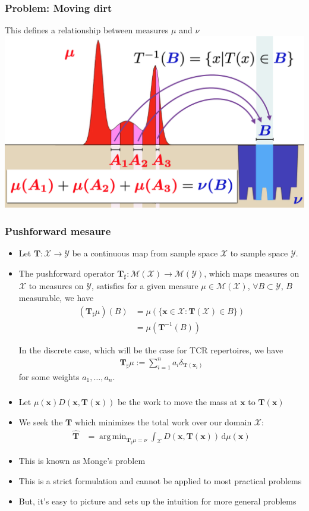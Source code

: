 \documentclass[mathserif,compress,xcolor={dvipsnames}]{beamer}
\newcommand*\ba{\[ \begin{aligned}}
\newcommand*\ea{\end{aligned} \]}
\newcommand*\estim[1]{\widehat{#1}}
\newcommand*\der{\text{d}}
\DeclareMathOperator*{\argmin}{arg\;min}
\renewcommand\;{\,}
\newcommand{\bx}{\mathbf x}
\newcommand{\bT}{\mathbf T}
\begin{document}
\begin{frame}\frametitle{Problem: Moving dirt}
This defines a relationship between measures $\mu$ and $\nu$
\bigskip
\includegraphics[width=\linewidth]{Figures/EMD_pushforward.png}
\end{frame}

\begin{frame}\frametitle{Pushforward mesaure}
\begin{itemize}
\item
Let $\mathbf T : \mathcal X \to \mathcal Y$ be a continuous map from sample space $\mathcal X$ to sample space $\mathcal Y$.
\item
The pushforward operator $\mathbf T_\sharp : \mathcal M(\mathcal X) \to \mathcal M(\mathcal Y)$, which maps measures on $\mathcal X$ to measures on $\mathcal Y$, satisfies for a given measure $\mu \in \mathcal M(\mathcal X)$,
 $\forall B \subset \mathcal Y$, $B$ measurable, we have
\begin{align}
    \left(\mathbf T_\sharp \mu\right) (B) 
    & = \mu\left( \{ \mathbf x \in \mathcal X : \mathbf T(\mathcal X) \in B \} \right) \\
    & = \mu\left(\mathbf T^{-1}(B) \right)
\end{align}

In the discrete case, which will be the case for TCR repertoires, we have
\ba
    \mathbf T_\sharp \mu := \sum_{i=1}^n a_i \delta_{\mathbf T(\mathbf x_i)}
\ea
for some weights $a_1, \dotsc, a_n$. 
\end{itemize}
\end{frame}

\begin{frame}\frametitle{}
\begin{itemize}
\item
Let $\mu(\bx) D(\bx, \bT(\bx))$ be the work to move the mass at $\bx$ to $\bT(\bx)$
\item
We seek the $\bT$ which minimizes the total work over our domain $\mathcal X$:
\ba
\estim \bT 
	& = \argmin_{\bT_\sharp\mu = \nu} \int_{\mathcal X} D(\bx, \bT(\bx)) \;\der \mu(\bx)
\ea
\item
This is known as Monge's problem
\item
This is a strict formulation and cannot be applied to most practical problems
\item
But, it's easy to picture and sets up the intuition for more general problems
\end{itemize}
\end{frame}
\end{document}
